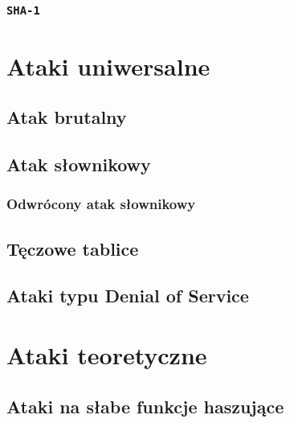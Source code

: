 \documentclass[12pt,a4paper,twoside]{article}
\begin{document}
\subsubsection{\texttt{SHA-1}}



\newpage
\section{Ataki uniwersalne}
\label{sec:universal_attacks}

\subsection{Atak brutalny}

\subsection{Atak słownikowy}

\subsubsection{Odwrócony atak słownikowy}

\subsection{Tęczowe tablice}

\subsection{Ataki typu Denial of Service}

\section{Ataki teoretyczne}

\subsection{Ataki na słabe funkcje haszujące}

\subsubsection{}

\subsubsection{}
\end{document}
